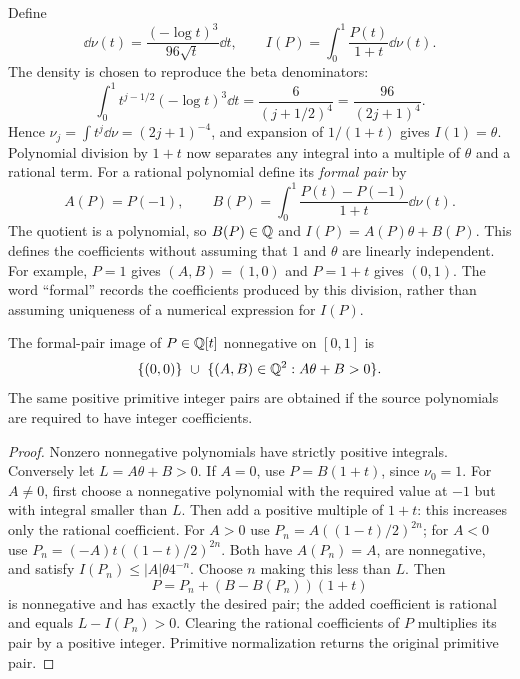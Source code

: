 Define
\begin{equation}\label{eq:scalar}
 \dd\nu(t)=\frac{(-\log t)^3}{96\sqrt t}\dd t,
 \qquad I(P)=\int_0^1\frac{P(t)}{1+t}\dd\nu(t).
\end{equation}
The density is chosen to reproduce the beta denominators:
\[
 \int_0^1t^{j-1/2}(-\log t)^3\dd t
       =\frac{6}{(j+1/2)^4}=\frac{96}{(2j+1)^4}.
\]
Hence $\nu_j=\int t^j\dd\nu=(2j+1)^{-4}$, and expansion of
$1/(1+t)$ gives $I(1)=\theta$. Polynomial division by $1+t$
now separates any integral into a multiple of $\theta$ and a rational
term. For a rational polynomial define its \emph{formal pair} by
\begin{equation}\label{eq:formal-pair}
 A(P)=P(-1),\qquad
 B(P)=\int_0^1\frac{P(t)-P(-1)}{1+t}\dd\nu(t).
\end{equation}
The quotient is a polynomial, so $B(P)\in\mathbb Q$ and
$I(P)=A(P)\theta+B(P)$. This defines the coefficients without assuming
that $1$ and $\theta$ are linearly independent. For example, $P=1$
gives $(A,B)=(1,0)$ and $P=1+t$ gives $(0,1)$.
The word ``formal'' records the coefficients produced by this division,
rather than assuming uniqueness of a numerical expression for $I(P)$.

\begin{theorem}\label{thm:cone}
The formal-pair image of $P\in\mathbb Q[t]$ nonnegative on $[0,1]$ is
\[
 \{(0,0)\}\ \cup\ \{(A,B)\in\Q^2:A\theta+B>0\}.
\]
The same positive primitive integer pairs are obtained if the source
polynomials are required to have integer coefficients.
\end{theorem}
\begin{proof}
Nonzero nonnegative polynomials have strictly positive integrals. Conversely
let $L=A\theta+B>0$. If $A=0$, use $P=B(1+t)$, since $\nu_0=1$.
For $A\ne0$, first choose a nonnegative polynomial with the required
value at $-1$ but with integral smaller than $L$. Then add a positive
multiple of $1+t$: this increases only the rational coefficient.
For $A>0$ use $P_n=A((1-t)/2)^{2n}$; for $A<0$ use
$P_n=(-A)t((1-t)/2)^{2n}$. Both have $A(P_n)=A$, are nonnegative,
and satisfy $I(P_n)\leq |A|\theta4^{-n}$. Choose $n$ making this less
than $L$. Then
\[
 P=P_n+(B-B(P_n))(1+t)
\]
is nonnegative and has exactly the desired pair; the added coefficient
is rational and equals $L-I(P_n)>0$. Clearing the rational coefficients
of $P$ multiplies its pair by a positive integer. Primitive normalization
returns the original primitive pair.
\end{proof}

